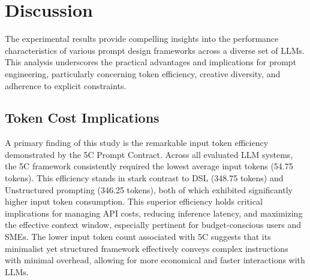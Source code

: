 \documentclass[10pt, a4paper]{article}
\begin{document}
\section{Discussion}
The experimental results provide compelling insights into the performance characteristics of various prompt design frameworks across a diverse set of LLMs. This analysis underscores the practical advantages and implications for prompt engineering, particularly concerning token efficiency, creative diversity, and adherence to explicit constraints.

\subsection{Token Cost Implications}
A primary finding of this study is the remarkable input token efficiency demonstrated by the 5C Prompt Contract. Across all evaluated LLM systems, the 5C framework consistently required the lowest average input tokens (54.75 tokens). This efficiency stands in stark contrast to DSL (348.75 tokens) and Unstructured prompting (346.25 tokens), both of which exhibited significantly higher input token consumption. This superior efficiency holds critical implications for managing API costs, reducing inference latency, and maximizing the effective context window, especially pertinent for budget-conscious users and SMEs. The lower input token count associated with 5C suggests that its minimalist yet structured framework effectively conveys complex instructions with minimal overhead, allowing for more economical and faster interactions with LLMs.
\end{document}
